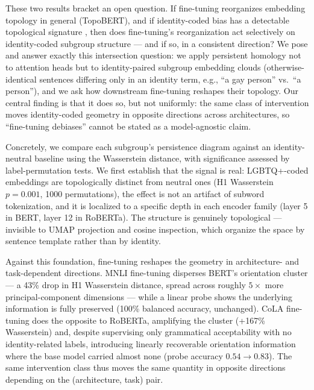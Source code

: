 \documentclass[11pt]{article}
\begin{document}
These two results bracket an open question. If fine-tuning reorganizes embedding topology in general (TopoBERT), and if identity-coded bias has a detectable topological signature \citep{varadarajan2025augmenting}, then does fine-tuning's reorganization act selectively on identity-coded subgroup structure --- and if so, in a consistent direction? We pose and answer exactly this intersection question: we apply persistent homology not to attention heads but to identity-paired subgroup embedding clouds (otherwise-identical sentences differing only in an identity term, e.g., ``a gay person'' vs.\ ``a person''), and we ask how downstream fine-tuning reshapes their topology. Our central finding is that it does so, but not uniformly: the same class of intervention moves identity-coded geometry in opposite directions across architectures, so ``fine-tuning debiases'' cannot be stated as a model-agnostic claim.

Concretely, we compare each subgroup's persistence diagram against an identity-neutral baseline using the Wasserstein distance, with significance assessed by label-permutation tests. We first establish that the signal is real: LGBTQ+-coded embeddings are topologically distinct from neutral ones (H1 Wasserstein $p = 0.001$, 1000 permutations), the effect is not an artifact of subword tokenization, and it is localized to a specific depth in each encoder family (layer 5 in BERT, layer 12 in RoBERTa). The structure is genuinely topological --- invisible to UMAP projection and cosine inspection, which organize the space by sentence template rather than by identity.

Against this foundation, fine-tuning reshapes the geometry in architecture- and task-dependent directions. MNLI fine-tuning disperses BERT's orientation cluster --- a 43\% drop in H1 Wasserstein distance, spread across roughly $5\times$ more principal-component dimensions --- while a linear probe shows the underlying information is fully preserved (100\% balanced accuracy, unchanged). CoLA fine-tuning does the opposite to RoBERTa, amplifying the cluster (+167\% Wasserstein) and, despite supervising only grammatical acceptability with no identity-related labels, introducing linearly recoverable orientation information where the base model carried almost none (probe accuracy $0.54 \rightarrow 0.83$). The same intervention class thus moves the same quantity in opposite directions depending on the (architecture, task) pair.
\end{document}
